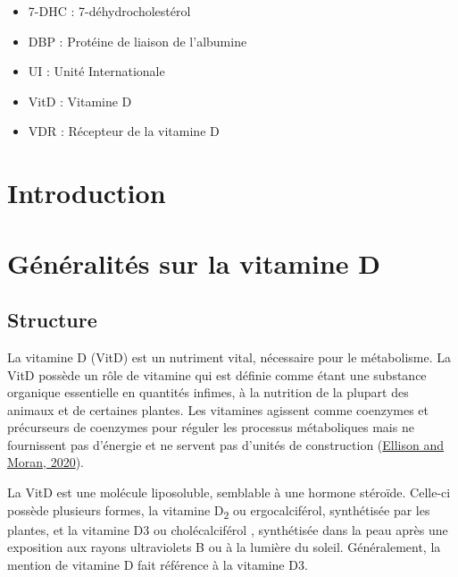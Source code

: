 \documentclass[
  letterpaper,
  DIV=11,
  numbers=noendperiod]{scrartcl}
\providecommand{\tightlist}{%
  \setlength{\itemsep}{0pt}\setlength{\parskip}{0pt}}\usepackage{longtable,booktabs,array}
\begin{document}
\begin{itemize}
\tightlist
\item
  7-DHC : 7-déhydrocholestérol
\item
  DBP : Protéine de liaison de l'albumine
\item
  UI : Unité Internationale
\item
  VitD : Vitamine D
\item
  VDR : Récepteur de la vitamine D
\end{itemize}

\newpage{}

\hypertarget{introduction}{%
\section{Introduction}\label{introduction}}


\newpage{}

\hypertarget{guxe9nuxe9ralituxe9s-sur-la-vitamine-d}{%
\section{Généralités sur la vitamine
D}\label{guxe9nuxe9ralituxe9s-sur-la-vitamine-d}}

\hypertarget{structure}{%
\subsection{Structure}\label{structure}}

La vitamine D (VitD) est un nutriment vital, nécessaire pour le
métabolisme. La VitD possède un rôle de vitamine qui est définie comme
étant une substance organique essentielle en quantités infimes, à la
nutrition de la plupart des animaux et de certaines plantes. Les
vitamines agissent comme coenzymes et précurseurs de coenzymes pour
réguler les processus métaboliques mais ne fournissent pas d'énergie et
ne servent pas d'unités de construction
(\protect\hyperlink{ref-Ellison.2020}{Ellison and Moran, 2020}).

La VitD est une molécule liposoluble, semblable à une hormone stéroïde.
Celle-ci possède plusieurs formes, la vitamine D\textsubscript{2} ou
ergocalciférol, synthétisée par les plantes, et la vitamine D3 ou
cholécalciférol , synthétisée dans la peau après une exposition aux
rayons ultraviolets B ou à la lumière du soleil. Généralement, la
mention de vitamine D fait référence à la vitamine D3.
\end{document}
